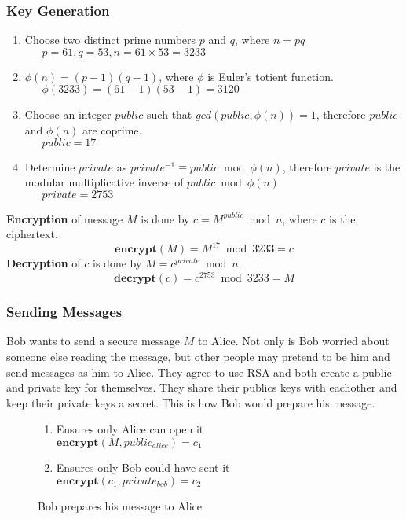 \documentclass{article}
\begin{document}
		\subsubsection{Key Generation}
			\begin{enumerate}
				\item Choose two distinct prime numbers $p$ and $q$, where $n = pq$ \hfill \\
					\small{$\phantom{\rightarrow} p = 61, q = 53, n = 61 \times 53 = 3233$}
				\item $\phi(n) = (p - 1)(q - 1)$, where $\phi$ is Euler's totient function. \hfill \\
					\small{$\phantom{\rightarrow} \phi(3233) = (61 - 1)(53 - 1) = 3120$}
				\item Choose an integer $public$ such that $gcd(public, \phi(n)) = 1$, therefore $public$ and $\phi(n)$ are coprime. \hfill \\
					\small{$\phantom{\rightarrow} public = 17$}
				\item Determine $private$ as $private^{-1} \equiv public \bmod{\phi(n)}$, therefore $private$ is the modular multiplicative inverse of $public \bmod{\phi(n)}$ \hfill \\
					\small{$\phantom{\rightarrow} private = 2753$}
			\end{enumerate}
			{\bf Encryption} of message $M$ is done by $c = M^{public} \bmod{n}$, where $c$ is the ciphertext.
			\begin{equation}
				\textbf{encrypt}(M) = M^{17} \bmod{3233} = c
			\end{equation}
			{\bf Decryption} of $c$ is done by $M = c^{private} \bmod{n}$.
			\begin{equation}
				\textbf{decrypt}(c) = c^{2753} \bmod{3233} = M
			\end{equation}

		\subsubsection{Sending Messages}
		Bob wants to send a secure message $M$ to Alice. Not only is Bob worried about someone else reading the message, but other people may pretend to be him and send messages as him to Alice. They agree to use RSA and both create a public and private key for themselves. They share their publics keys with eachother and keep their private keys a secret. This is how Bob would prepare his message.
		\begin{figure}[h]
			\centering
			\begin{enumerate}
				\item Ensures only Alice can open it \hfill \\
					$\textbf{encrypt}(M, public_{alice}) = c_1$
				\item Ensures only Bob could have sent it \hfill \\
					$\textbf{encrypt}(c_1, private_{bob}) = c_2$
			\end{enumerate}
			{\caption*{Bob prepares his message to Alice}}
		\end{figure}
\end{document}
